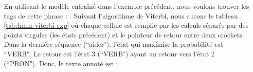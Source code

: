 \documentclass{KodeBook}
\begin{document}
En utilisant le modèle entraîné dans l'exemple précédent, nous voulons trouver les tags de cette phrase : . 
Suivant l'algorithme de Viterbi, nous aurons le tableau \ref{tab:hmm-viterbi-exp} où chaque cellule est remplie par les calculs séparés par des points virgules (les états précédent) et le pointeur de retour entre deux crochets. 
Dans la dernière séquence (``aider"), l'état qui maximise la probabilité est ``VERB". 
Le retour est l'état 3 (``VERB") ayant un retour vers l'état 2 (``PRON"). 
Donc, le texte annoté est : . 

\end{document}
